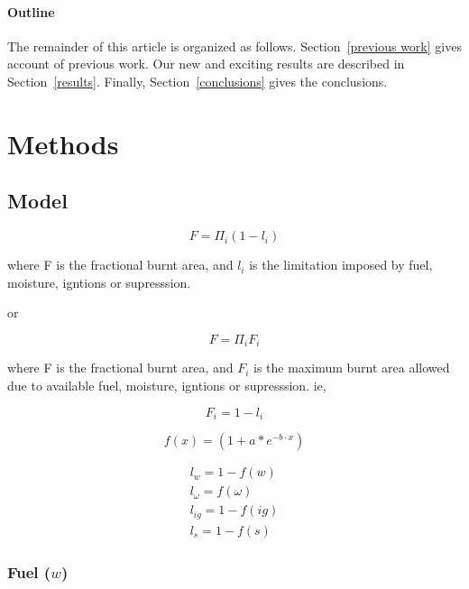 \documentclass[12pt]{article}
\begin{document}
\paragraph{Outline}
The remainder of this article is organized as follows.
Section~\ref{previous work} gives account of previous work.
Our new and exciting results are described in Section~\ref{results}.
Finally, Section~\ref{conclusions} gives the conclusions.

\section{Methods}

\subsection{Model}

\begin{equation}
    F=\Pi_{i} (1 - l_i)
\end{equation}

where F is the fractional burnt area, and $l_i$ is the limitation imposed by fuel, moisture, igntions or supresssion.
\newline

or

\begin{equation} 
    F=\Pi_{i} F_i 
\end{equation}

where F is the fractional burnt area, and $F_i$ is the maximum burnt area allowed due to available fuel, moisture, igntions or supresssion. ie, 

\begin{equation}
    F_i = 1 - l_i
\end{equation}

\begin{equation}
    f(x) = (1 + a * e^{-b \cdot x})
\end{equation}

\begin{equation}
\begin{split}
    l_{w} = 1 - f(w) \\
    l_{\omega} = f(\omega) \\
    l_{ig} = 1 - f(ig) \\
    l_{s} = 1- f(s)
\end{split}
\end{equation}


\subsubsection{Fuel ($w$)}
\end{document}

